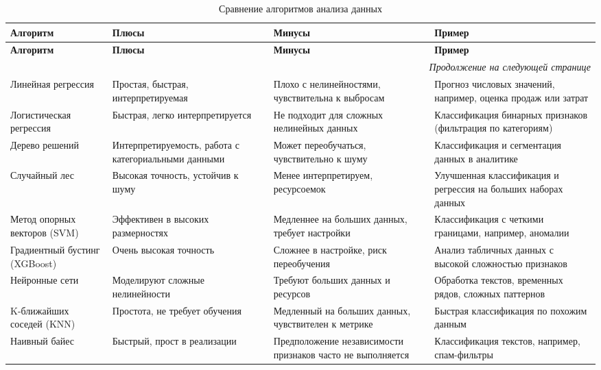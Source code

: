 \documentclass[14pt]{extarticle}
\begin{document}
\begin{longtable}{|p{3.5cm}|p{3.5cm}|p{3.5cm}|p{4.5cm}|}
\caption{Сравнение алгоритмов анализа данных} \\
\hline
\textbf{Алгоритм} & \textbf{Плюсы} & \textbf{Минусы} & \textbf{Пример} \\
\hline
\endfirsthead

\hline
\textbf{Алгоритм} & \textbf{Плюсы} & \textbf{Минусы} & \textbf{Пример} \\
\hline
\endhead

\hline \multicolumn{4}{r}{\textit{Продолжение на следующей странице}} \\
\endfoot

\hline
\endlastfoot

Линейная регрессия & Простая, быстрая, интерпретируемая & Плохо с нелинейностями, чувствительна к выбросам & Прогноз числовых значений, например, оценка продаж или затрат \\
\hline
Логистическая регрессия & Быстрая, легко интерпретируется & Не подходит для сложных нелинейных данных & Классификация бинарных признаков (фильтрация по категориям) \\
\hline
Дерево решений & Интерпретируемость, работа с категориальными данными & Может переобучаться, чувствительно к шуму & Классификация и сегментация данных в аналитике \\
\hline
Случайный лес & Высокая точность, устойчив к шуму & Менее интерпретируем, ресурсоемок & Улучшенная классификация и регрессия на больших наборах данных \\
\hline
Метод опорных векторов (SVM) & Эффективен в высоких размерностях & Медленнее на больших данных, требует настройки & Классификация с четкими границами, например, аномалии \\
\hline
Градиентный бустинг (XGBoost) & Очень высокая точность & Сложнее в настройке, риск переобучения & Анализ табличных данных с высокой сложностью признаков \\
\hline
Нейронные сети & Моделируют сложные нелинейности & Требуют больших данных и ресурсов & Обработка текстов, временных рядов, сложных паттернов \\
\hline
K-ближайших соседей (KNN) & Простота, не требует обучения & Медленный на больших данных, чувствителен к метрике & Быстрая классификация по похожим данным \\
\hline
Наивный байес & Быстрый, прост в реализации & Предположение независимости признаков часто не выполняется & Классификация текстов, например, спам-фильтры \\

\end{longtable}
\end{document}
